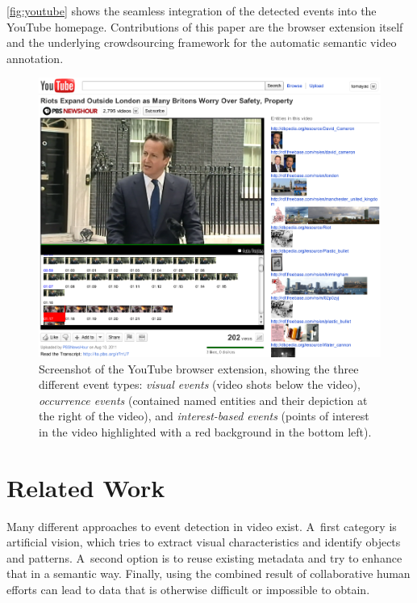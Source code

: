 \documentclass[runningheads,a4paper]{llncs}
\begin{document}
\autoref{fig:youtube} shows the seamless integration of the detected events into the YouTube homepage. Contributions of this paper are the browser extension itself and the underlying crowdsourcing framework for the automatic semantic video annotation.

\begin{figure}[htb!]
\begin{center}
   \includegraphics[width=0.8\linewidth]{./resources/youtube}
\end{center}
   \caption{Screenshot of the YouTube browser extension, showing the three different event types: \emph{visual events} (video shots below the video), \emph{occurrence events} (contained named entities and their depiction at the right of the video), and \emph{interest-based events} (points of interest in the video highlighted with a red background in the bottom left).}
\label{fig:youtube}
\end{figure}


\section{Related Work} \label{sec:related-work}
Many different approaches to event detection in video exist.
A~first category is artificial vision, which tries to extract visual characteristics and identify objects and patterns.
A~second option is to reuse existing metadata and try to enhance that in a semantic way.
Finally, using the combined result of collaborative human efforts can lead to data that is otherwise difficult or impossible to obtain.
\end{document}

